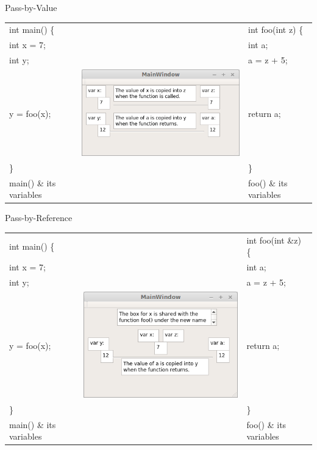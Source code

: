 \documentclass[presentation]{beamer}
\begin{document}
\begin{frame}[label=sec-7]{Pass-by-Value}
\begin{center}
\begin{tabular}{lll}
\hline
int main() \{ &  & int foo(int z) \{\\
int x = 7; &  & int a;\\
int y; &  & a = z + 5;\\
y = foo(x); & \includegraphics[width=.4\linewidth]{./myfunc.png} & return a;\\
\} &  & \}\\
\alert{main() \& its variables} &  & \alert{foo() \& its variables}\\
\hline
\end{tabular}
\end{center}
\end{frame}

\begin{frame}[label=sec-8]{Pass-by-Reference}
\begin{center}
\begin{tabular}{lll}
\hline
int main() \{ &  & int foo(int \&z) \{\\
int x = 7; &  & int a;\\
int y; &  & a = z + 5;\\
y = foo(x); & \includegraphics[width=.4\linewidth]{./reference.png} & return a;\\
\} &  & \}\\
\alert{main() \& its variables} &  & \alert{foo() \& its variables}\\
\hline
\end{tabular}
\end{center}
\end{frame}
\end{document}
